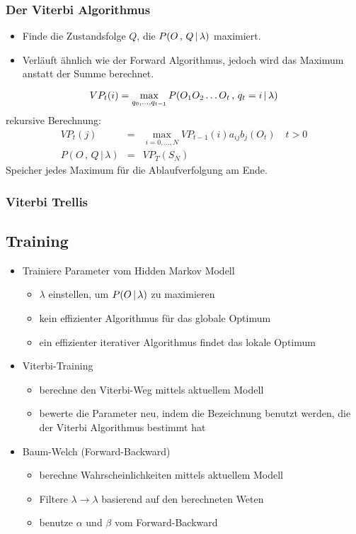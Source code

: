 \subsubsection*{Der Viterbi Algorithmus}

\begin{itemize}
\item Finde die Zustandsfolge $Q$, die $P(O \, , \, Q \, | \, \lambda)$ maximiert.
\item Verläuft ähnlich wie der Forward Algorithmus, jedoch wird das Maximum anstatt der Summe berechnet.
\end{itemize}
$$VP_t(i) = \max_{q_0, \dots, q_{t-1}} P(O_1O_2 \dots O_{t} \, , \, q_t = i \, | \, \lambda)$$
rekursive Berechnung:
\begin{eqnarray*}
VP_t(j) &=& \max_{i=0, \dots, N} VP_{t-1}(i) a_{ij}b_j(O_t) \quad t > 0 \\
P(O \, , \, Q \, | \, \lambda) &=& VP_T(S_N)
\end{eqnarray*}
Speicher jedes Maximum für die Ablaufverfolgung am Ende.

\subsubsection*{Viterbi Trellis}


\subsection{Training}

\begin{itemize}
\item Trainiere Parameter vom Hidden Markov Modell
\begin{itemize}
\item $\lambda$ einstellen, um $P(O \, | \, \lambda)$ zu maximieren
\item kein effizienter Algorithmus für das globale Optimum
\item ein effizienter iterativer Algorithmus findet das lokale Optimum
\end{itemize}
\item Viterbi-Training
\begin{itemize}
\item berechne den Viterbi-Weg mittels aktuellem Modell
\item bewerte die Parameter neu, indem die Bezeichnung benutzt werden, die der Viterbi Algorithmus bestimmt hat
\end{itemize}
\item Baum-Welch (Forward-Backward)
\begin{itemize}
\item berechne Wahrscheinlichkeiten mittels aktuellem Modell
\item Filtere $\lambda \to \lambda$ basierend auf den berechneten Weten
\item benutze $\alpha$ und $\beta$ vom Forward-Backward
\end{itemize}
\end{itemize}

